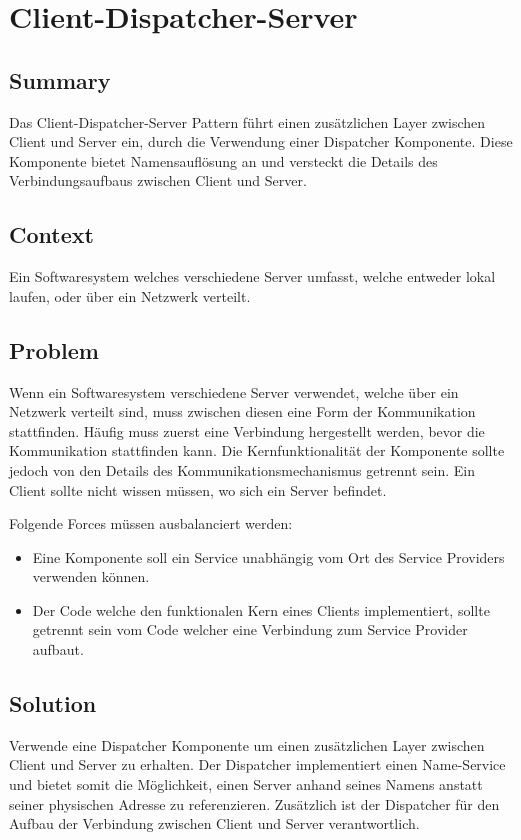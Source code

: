 \chapter{Client-Dispatcher-Server}
\section{Summary}
Das Client-Dispatcher-Server Pattern führt einen zusätzlichen Layer zwischen Client und Server ein, durch die Verwendung einer Dispatcher Komponente. Diese Komponente bietet Namensauflösung an und versteckt die Details des Verbindungsaufbaus zwischen Client und Server.

\section{Context}
Ein Softwaresystem welches verschiedene Server umfasst, welche entweder lokal laufen, oder über ein Netzwerk verteilt.

\section{Problem}
Wenn ein Softwaresystem verschiedene Server verwendet, welche über ein Netzwerk verteilt sind, muss zwischen diesen eine Form der Kommunikation stattfinden. Häufig muss zuerst eine Verbindung hergestellt werden, bevor die Kommunikation stattfinden kann. Die Kernfunktionalität der Komponente sollte jedoch von den Details des Kommunikationsmechanismus getrennt sein. Ein Client sollte nicht wissen müssen, wo sich ein Server befindet.

Folgende Forces müssen ausbalanciert werden:
\begin{itemize}
	\item Eine Komponente soll ein Service unabhängig vom Ort des Service Providers verwenden können.
	\item Der Code welche den funktionalen Kern eines Clients implementiert, sollte getrennt sein vom Code welcher eine Verbindung zum Service Provider aufbaut.
\end{itemize}

\section{Solution}
Verwende eine Dispatcher Komponente um einen zusätzlichen Layer zwischen Client und Server zu erhalten. Der Dispatcher implementiert einen Name-Service und bietet somit die Möglichkeit, einen Server anhand seines Namens anstatt seiner physischen Adresse zu referenzieren. Zusätzlich ist der Dispatcher für den Aufbau der Verbindung zwischen Client und Server verantwortlich.

